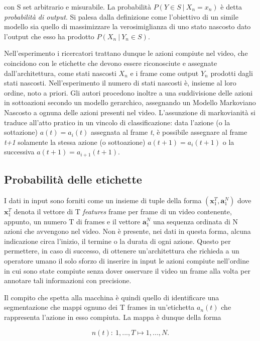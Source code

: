 \documentclass[10pt,letterpaper]{article}
\begin{document}
con S set arbitrario e misurabile. La probabilità $P(Y \in S\:|\:X_n = x_n)$ è detta \textit{probabilità di output}. Si palesa dalla definizione come l'obiettivo di un simile modello sia quello di massimizzare la verosimiglianza di uno stato nascosto dato l'output che esso ha prodotto $P(X_n\:|\:Y_n \in S)$.

Nell'esperimento i ricercatori trattano dunque le azioni compiute nel video, che coincidono con le etichette che devono essere riconosciute e assegnate dall'architettura, come stati nascosti $X_n$ e i frame come output $Y_n$ prodotti dagli stati nascosti. Nell'esperimento il numero di stati nascosti è, insieme al loro ordine, noto a priori. Gli autori procedono inoltre a una suddivisione delle azioni in sottoazioni secondo un modello gerarchico, assegnando un Modello Markoviano Nascosto a ognuna delle azioni presenti nel video. L'assunzione di markovianità si traduce all'atto pratico in un vincolo di classificazione: data l'azione (o la sottazione) $a(t) = a_i(t)$ assegnata al frame \textit{t}, è possibile assegnare al frame \textit{t+1} solamente la stessa azione (o sottoazione) $a(t+1) = a_i(t+1)$ o la successiva $a(t+1) = a_{i+1}(t+1)$.

\subsection{Probabilità delle etichette}
I dati in input sono forniti come un insieme di tuple della forma $(\textbf{x}_1^T,\textbf{a}_1^N)$ dove $\textbf{x}_1^T$ denota il vettore di T \textit{features} frame per frame di un video contenente, appunto, un numero T di frames e il vettore $\textbf{a}_1^N$ una sequenza ordinata di N azioni che avvengono nel video. Non è presente, nei dati in questa forma, alcuna indicazione circa l'inizio, il termine o la durata di ogni azione. Questo per permettere, in caso di successo, di ottenere un'architettura che richieda a un operatore umano il solo sforzo di inserire in input le azioni compiute nell'ordine in cui sono state compiute senza dover osservare il video un frame alla volta per annotare tali informazioni con precisione.

Il compito che spetta alla macchina è quindi quello di identificare una segmentazione che mappi ognuno dei T frames in un'etichetta $a_n(t)$ che rappresenta l'azione in esso compiuta. La mappa è dunque della forma

\begin{equation}
n(t):\:{1,...,T}\longmapsto{1,...,N}.
\end{equation}
\end{document}
